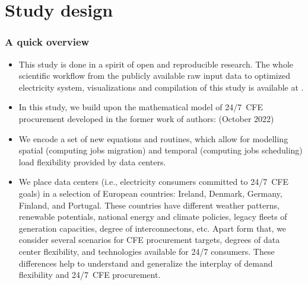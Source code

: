 \section{Study design}


\begin{frame}
  \frametitle{A quick overview}

{\footnotesize
  \begin{itemize}
    
    \item This study is done in a spirit of open and reproducible research. The whole scientific workflow from the publicly available raw input data to optimized electricity system, visualizations and compilation of this study is available at . 
    
    \item In this study, we build upon the mathematical model of 24/7~CFE procurement developed in the former work of authors:  (October 2022)
    
    \item We encode a set of new equations and routines, which allow for modelling \alert{spatial} (computing jobs migration) and \alert{temporal} (computing jobs scheduling) load flexibility provided by data centers.

    \item We place data centers (i.e., electricity consumers committed to 24/7~CFE goals) in a selection of European countries: Ireland, Denmark, Germany, Finland, and Portugal. These countries have different weather patterns, renewable potentials, national energy and climate policies, legacy fleets of generation capacities, degree of interconnectons, etc. Apart form that, we consider several scenarios for CFE procurement targets, degrees of data center flexibility, and technologies available for 24/7 consumers. These differences help to \alert{understand and generalize} the interplay of demand flexibility and 24/7~CFE procurement.

  \end{itemize}
}
\end{frame}


